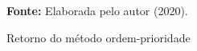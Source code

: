 \begin{figure}[ht!]
\centering

\caption{\textmd{Retorno do método ordem-prioridade}}
\label{fig:retordemprioridade}

\par\medskip\textbf{Fonte:} Elaborada pelo autor (2020). \par\medskip

\end{figure}

